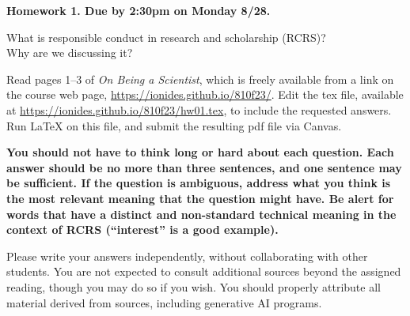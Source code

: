 \documentclass[12pt]{article}
\begin{document}
\begin{center}\bf 
Homework 1. Due by 2:30pm on Monday 8/28. 

What is responsible conduct in research and scholarship (RCRS)? \\
Why are we discussing it? 
\end{center}

Read pages 1--3 of {\em On Being a Scientist}, which is freely available from a link on the course web page, \url{https://ionides.github.io/810f23/}. Edit the tex file, available at \url{https://ionides.github.io/810f23/hw01.tex}, to include the requested answers. Run {\LaTeX} on this file, and submit the resulting pdf file via Canvas.

{\bf You should not have to think long or hard about each question. Each answer should be no more than three sentences, and one sentence may be sufficient. If the question is ambiguous, address what you think is the most relevant meaning that the question might have. Be alert for words that have a distinct and non-standard technical meaning in the context of RCRS (``interest'' is a good example).

  Please write your answers independently, without collaborating with other students. You are not expected to consult additional sources beyond the assigned reading, though you may do so if you wish. You should properly attribute all material derived from sources, including generative AI programs.

}
\end{document}
